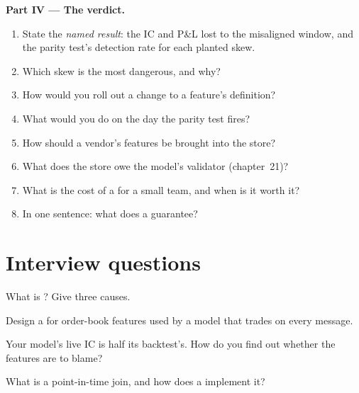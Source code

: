 \begin{problem}
\medskip\noindent\textbf{Part IV --- The verdict.}
\begin{enumerate}[resume]
\item State the \emph{named result}: the IC and P\&L lost to the misaligned window, and the parity test's detection rate for each
planted skew.
\item Which skew is the most dangerous, and why?
\item How would you roll out a change to a feature's definition?
\item What would you do on the day the parity test fires?
\item How should a vendor's features be brought into the store?
\item What does the store owe the model's validator (chapter~21)?
\item What is the cost of a  for a small team, and when is it worth it?
\item In one sentence: what does a  guarantee?
\end{enumerate}
\end{problem}

\section{Interview questions}

\begin{interviewq}\label{iq:ml:data-and-feature-stores:1}
What is ? Give three causes.
\end{interviewq}

\begin{interviewq}\label{iq:ml:data-and-feature-stores:2}
Design a  for order-book features used by a model that trades on every message.
\end{interviewq}

\begin{interviewq}\label{iq:ml:data-and-feature-stores:3}
Your model's live IC is half its backtest's. How do you find out whether the features are to blame?
\end{interviewq}

\begin{interviewq}\label{iq:ml:data-and-feature-stores:4}
What is a point-in-time join, and how does a  implement it?
\end{interviewq}

